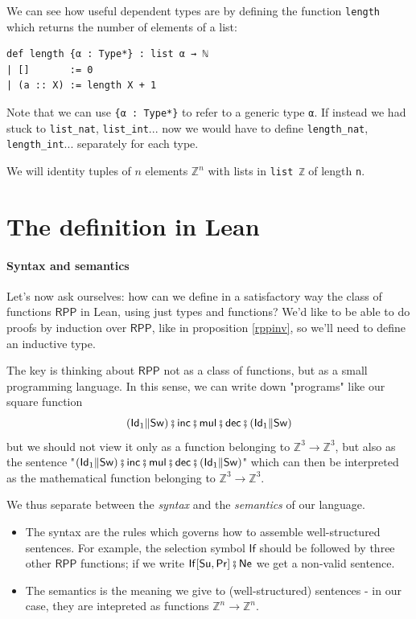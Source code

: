 \documentclass{book}
\theoremstyle{definition}
\theoremstyle{remark}
\theoremstyle{plain}
\newcommand{\ZZ}{\mathbb{Z}}
\newcommand{\RPP}{\mathsf{RPP}}
\newcommand{\rppId}{\mathsf{Id}}
\newcommand{\rppNe}{\mathsf{Ne}}
\newcommand{\rppSu}{\mathsf{Su}}
\newcommand{\rppPr}{\mathsf{Pr}}
\newcommand{\rppSw}{\mathsf{Sw}}
\newcommand{\rppCo}{\fatsemi}
\newcommand{\rppPa}{\Vert}
\newcommand{\rppIf}{\mathsf{If}}
\newcommand{\rppinc}{\mathsf{inc}}
\newcommand{\rppdec}{\mathsf{dec}}
\newcommand{\rppmul}{\mathsf{mul}}
\begin{document}
We can see how useful dependent types are by defining the function \lstinline{length}
which returns the number of elements of a list:
\begin{lstlisting}
def length {α : Type*} : list α → ℕ
| []       := 0
| (a :: X) := length X + 1
\end{lstlisting}
Note that we can use \lstinline|{α : Type*}| to refer to a generic type \lstinline{α}.
If instead we had stuck to \lstinline{list_nat}, \lstinline{list_int}...
now we would have to define \lstinline{length_nat}, \lstinline{length_int}... separately for each type.

We will identity tuples of $n$ elements $\ZZ^n$ with lists in \lstinline{list ℤ} of length \lstinline{n}.

\section{The definition in Lean}

\paragraph{Syntax and semantics}
Let's now ask ourselves: how can we define in a satisfactory way the class of functions $\RPP$ in Lean,
using just types and functions?
We'd like to be able to do proofs by induction over $\RPP$, like in proposition \ref{rppinv}, so we'll need to define an inductive type.

The key is thinking about $\RPP$ not as a class of functions, but as a small programming language.
In this sense, we can write down "programs" like our square function
\[(\rppId_1 \rppPa \rppSw) \rppCo \rppinc \rppCo \rppmul \rppCo \rppdec \rppCo (\rppId_1 \rppPa \rppSw)\]
but we should not view it only as a function belonging to $\ZZ^3 \to \ZZ^3$,
but also as the sentence
"$(\rppId_1 \rppPa \rppSw) \rppCo \rppinc \rppCo \rppmul \rppCo \rppdec \rppCo (\rppId_1 \rppPa \rppSw)$"
which can then be interpreted as the mathematical function belonging to $\ZZ^3 \to \ZZ^3$.

We thus separate between the \textit{syntax} and the \textit{semantics} of our language.
\begin{itemize}
\item The syntax are the rules which governs how to assemble well-structured sentences.
For example, the selection symbol $\rppIf$ should be followed by three other $\RPP$ functions;
if we write $\rppIf[\rppSu, \rppPr] \rppCo \rppNe$ we get a non-valid sentence.
\item The semantics is the meaning we give to (well-structured) sentences -
in our case, they are intepreted as functions $\ZZ^n \to \ZZ^n$.
\end{itemize}
\end{document}
